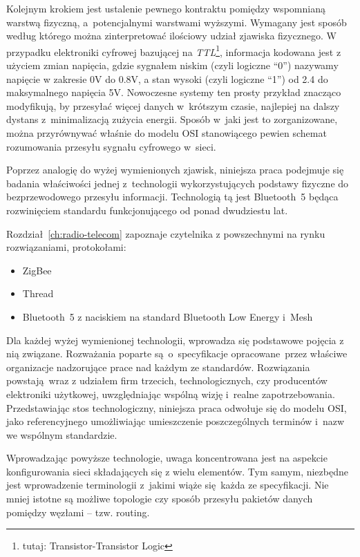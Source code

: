 Kolejnym krokiem jest ustalenie pewnego kontraktu pomiędzy wspomnianą warstwą fizyczną, a~potencjalnymi
warstwami wyższymi. Wymagany jest sposób według którego można zinterpretować ilościowy udział
zjawiska fizycznego. W przypadku elektroniki cyfrowej bazującej na \textit{TTL}\footnote{tutaj: Transistor-Transistor Logic},
informacja kodowana jest z użyciem zmian napięcia, gdzie sygnałem niskim (czyli logiczne \enquote{0}) nazywamy 
napięcie w zakresie 0V do 0.8V, a stan wysoki (czyli logiczne \enquote{1}) od 2.4 do maksymalnego napięcia 5V.
Nowoczesne systemy ten prosty przykład znacząco modyfikują, by przesyłać więcej danych w~krótszym czasie,
najlepiej na dalszy dystans z~minimalizacją zużycia energii. Sposób w~jaki jest to zorganizowane,
można przyrównywać właśnie do modelu \gls{OSI} stanowiącego pewien schemat rozumowania przesyłu sygnału
cyfrowego w~sieci.

Poprzez analogię do wyżej wymienionych zjawisk, niniejsza praca podejmuje się badania właściwości
jednej z~technologii wykorzystujących podstawy fizyczne do bezprzewodowego przesyłu informacji. 
Technologią tą jest Bluetooth~5 będąca rozwinięciem standardu funkcjonującego od ponad dwudziestu lat.

Rozdział~\ref{ch:radio-telecom} zapoznaje czytelnika z powszechnymi na rynku rozwiązaniami, protokołami:
\begin{itemize}
\item ZigBee
\item Thread
\item Bluetooth~5 z naciskiem na standard Bluetooth Low Energy i~Mesh
\end{itemize}

Dla każdej wyżej wymienionej technologii, wprowadza się podstawowe pojęcia z nią związane. Rozważania
poparte są o~specyfikacje opracowane przez właściwe organizacje nadzorujące prace nad każdym ze
standardów. Rozwiązania powstają wraz z udziałem firm trzecich, technologicznych, czy producentów
elektroniki użytkowej, uwzględniając wspólną wizję i~realne zapotrzebowania. Przedstawiając
stos technologiczny, niniejsza praca odwołuje się do modelu \gls{OSI}, jako referencyjnego umożliwiając
umieszczenie poszczególnych terminów i~nazw we wspólnym standardzie.

Wprowadzając powyższe technologie, uwaga koncentrowana jest na aspekcie konfigurowania sieci
składających się z wielu elementów. Tym samym, niezbędne jest wprowadzenie terminologii z~jakimi
wiąże się każda ze specyfikacji. Nie mniej istotne są możliwe topologie czy sposób przesyłu
pakietów danych pomiędzy węzłami -- tzw. routing.


